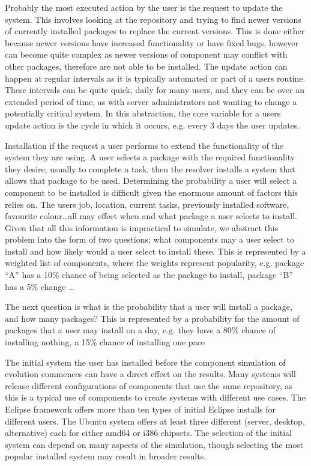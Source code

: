 Probably the most executed action by the user is the request to update the system.
This involves looking at the repository and trying to find newer versions of currently installed packages to replace the current versions.
This is done either because newer versions have increased functionality or have fixed bugs,
however can become quite complex as newer versions of component may conflict with other packages, therefore are not able to be installed.
The update action can happen at regular intervals as it is typically automated or part of a users routine.
These intervals can be quite quick, daily for many users, 
and they can be over an extended period of time, 
as with server administrators not wanting to change a potentially critical system.
In this abstraction, the core variable for a users update action is the cycle in which it occurs,
e.g. every 3 days the user updates.

Installation if the request a user performs to extend the functionality of the system they are using.
A user selects a package with the required functionality they desire, usually to complete a task,
then the resolver installs a system that allows that package to be used.
Determining the probability a user will select a component to be installed is difficult given the enormous amount of factors this relies on.
The users job, location, current tasks, previously installed software, favourite colour\ldots all may effect when and what package a user selects to install.
Given that all this information is impractical to simulate, we abstract this problem into the form of two questions;
what components may a user select to install and how likely would a user select to install these.
This is represented by a weighted list of components, where the weights represent popularity,
e.g. package ``A'' has a 10\% chance of being selected as the package to install, package ``B'' has a 5\% change \ldots

The next question is what is the probability that a user will install a package, and how many packages?
This is represented by a probability for the amount of packages that a user may install on a day,
e.g. they have a 80\% chance of installing nothing, a 15\% chance of installing one pace

The initial system the user has installed before the component simulation of evolution commences can have a direct effect on the results.
Many systems will release different configurations of components that use the same repository, as this is a typical use of components to create systems with different use cases.
The Eclipse framework offers more than ten types of initial Eclipse installs for different users.
The Ubuntu system offers at least three different (server, desktop, alternative) each for either amd64 or i386 chipsets.
The selection of the initial system can depend on many aspects of the simulation, 
though selecting the most popular installed system may result in broader results. 

